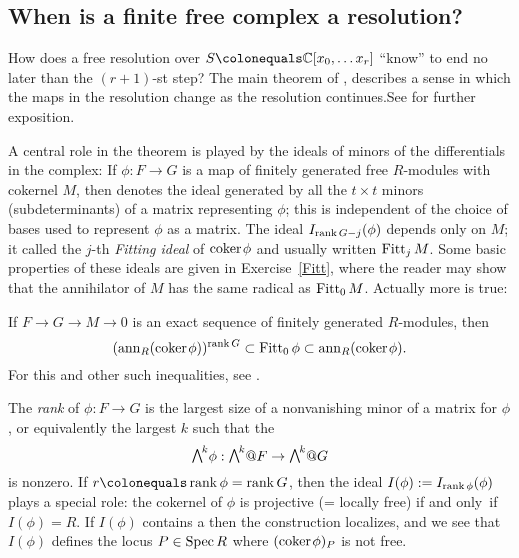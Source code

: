 \subsection*{When is a finite free complex a resolution?}
How does a free resolution over $S \colonequals  \CC[x_0, \dots x_r]$
``know'' to end no later than the $(r+1)$-st step?
The main theorem of \cite{WMACE}, describes a sense in which the maps in the resolution
change as the resolution continues.See \cite[Theorem 20.9]{Eisenbud1995}
for further exposition.

A central role in the theorem is played by the ideals of minors of the
differentials in the complex: If $\phi: F\to G$ is a map of finitely
generated free $R$-modules with cokernel $M$, then
denotes the ideal generated by all the $t\times t$ minors
(subdeterminants) of a matrix representing $\phi$; this is independent
of the choice of bases used to represent $\phi$ as a matrix.
The ideal $I_{\operatorname{rank} G -j}(\phi)$ depends only on $M$; it called the
$j$-th \emph{Fitting ideal} of ${\rm{coker}\kern1pt} \phi$  and
%
%
usually written $\operatorname{Fitt}_{j} M$. Some basic properties of these ideals are
given in Exercise~\ref{Fitt}, where the reader may show that the
annihilator of $M$ has the
same radical as $\operatorname{Fitt}_{0} M$. Actually more is true:

\begin{fact}
If $F\to G \to M \to 0$ is an exact sequence of finitely generated
$R$-modules, then
$$
({\rm{ann}}_{R}({\rm{coker}\kern1pt} \phi))^{\operatorname{rank} G}\subset \operatorname{Fitt}_{0}\phi \subset
{\rm{ann}}_{R}({\rm{coker}\kern1pt} \phi).
$$
For this and other such inequalities, see \cite{MR476736}.
\end{fact}

The \emph{rank} of $\phi: F\to G$ is the largest size of a nonvanishing
%
minor of a matrix for $\phi$,
or equivalently the largest $k$ such that the
%
$$\mwedge^{k}\phi : \mwedge^{k}@F \to \mwedge^{k}@G$$
is nonzero. If $r\colonequals  \rank \phi = \rank G$, then the ideal
$I(\phi): = I_{\operatorname{rank} \phi}(\phi)$ plays a special role: the cokernel
of $\phi$
is projective (= locally free) if and only~if $I(\phi) = R$. If $I(\phi)$
contains a
%
then
the construction localizes, and we see that $I(\phi)$ defines the locus
$P\in \operatorname{Spec} R$ where $({\rm{coker}\kern1pt} \phi)_{P}$
is not free.


